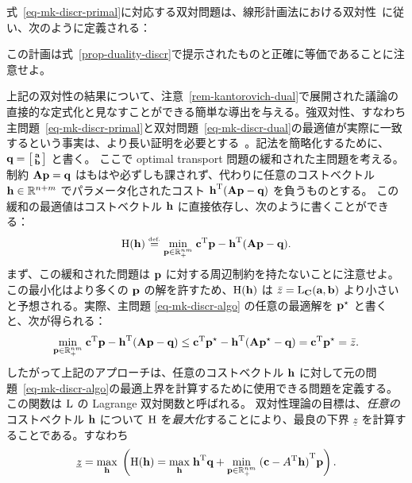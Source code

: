 式~\eqref{eq-mk-discr-primal}に対応する双対問題は、線形計画法における双対性~\citep[p. 143]{bertsimas1997introduction}に従い、次のように定義される：

この計画は式~\eqref{prop-duality-discr}で提示されたものと正確に等価であることに注意せよ。


\begin{rem}\label{rem-duality} 上記の双対性の結果について、注意~\ref{rem-kantorovich-dual}で展開された議論の直接的な定式化と見なすことができる簡単な導出を与える。強双対性、すなわち主問題~\eqref{eq-mk-discr-primal}と双対問題~\eqref{eq-mk-discr-dual}の最適値が実際に一致するという事実は、より長い証明を必要とする~\citep[\S4.10]{bertsimas1997introduction}。記法を簡略化するために、$\q=\bigl[\begin{smallmatrix}\a\\ \b \end{smallmatrix} \bigr]$ と書く。
ここで optimal transport 問題の緩和された主問題を考える。制約 $\mathbf{A}\p=\q$ はもはや必ずしも課されず、代わりに任意のコストベクトル $\hD\in\RR^{n+m}$ でパラメータ化されたコスト $\transp{\hD}(\mathbf{A}\p-\q)$ を負うものとする。
この緩和の最適値はコストベクトル $\hD$ に直接依存し、次のように書くことができる：
$$\LagrangeMKD(\hD)\eqdef \umin{\p \in \RR^{nm}_+} \transp{\cc}\p-\transp{\hD}(\mathbf{A}\p-\q).$$
まず、この緩和された問題は $\p$ に対する周辺制約を持たないことに注意せよ。この最小化はより多くの $\p$ の解を許すため、$\LagrangeMKD(\hD)$ は $\bar{z}=\MKD_{\C}(\a,\b)$ より小さいと予想される。実際、主問題 \eqref{eq-mk-discr-algo} の任意の最適解を $\p^\star$ と書くと、次が得られる：
$$\umin{\p \in \RR^{nm}_+} \transp{\cc}\p-\transp{\hD}(\mathbf{A}\p-\q) \leq \transp{\cc}\p^\star-\transp{\hD}(\mathbf{A}\p^\star-\q)=\transp{\cc}\p^\star=\bar{z}.$$
したがって上記のアプローチは、任意のコストベクトル $\hD$ に対して元の問題~\eqref{eq-mk-discr-algo}の最適上界を計算するために使用できる問題を定義する。この関数は $\MKD$ の Lagrange 双対関数と呼ばれる。
双対性理論の目標は、\emph{任意の}コストベクトル $\hD$ について $\LagrangeMKD$ を\emph{最大化}することにより、最良の下界 $\underline{z}$ を計算することである。すなわち
$$
	\underline{z}=\umax{\hD} \pa{ \LagrangeMKD(\hD)=\umax{\hD} \transp{\hD}\q + \umin{\p \in \RR^{nm}_+} \transp{(\cc-\transp{A}\hD)}\p }.
$$
\end{rem}
